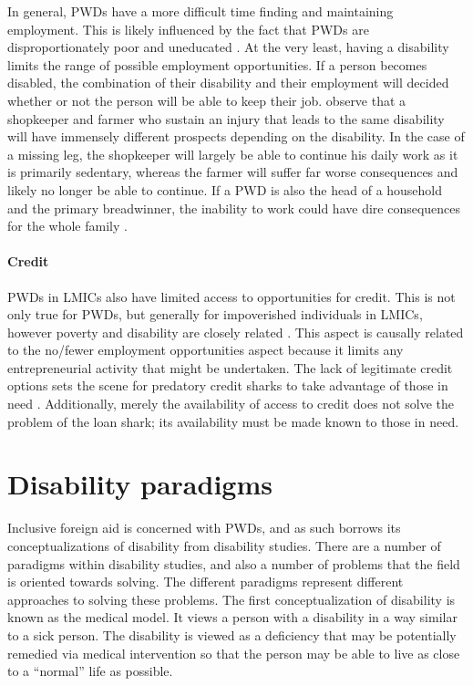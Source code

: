 \documentclass[a4paper]{article}
\begin{document}
In general, PWDs have a more difficult time finding and maintaining
employment. This is likely influenced by the fact that PWDs are
disproportionately poor and uneducated \cite{lamichhane2014nexus}. At the very
least, having a disability limits the range of possible employment
opportunities. If a person becomes disabled, the combination of their
disability and their employment will decided whether or not the person will be
able to keep their job. \cite{chowdhury2006economics} observe that a
shopkeeper and farmer who sustain an injury that leads to the same disability
will have immensely different prospects depending on the disability. In the
case of a missing leg, the shopkeeper will largely be able to continue his
daily work as it is primarily sedentary, whereas the farmer will suffer far
worse consequences and likely no longer be able to continue. If a PWD is also
the head of a household and the primary breadwinner, the inability to work
could have dire consequences for the whole family \citep{world2011world}.


\paragraph{Credit}

PWDs in LMICs also have limited access to opportunities for credit. This is
not only true for PWDs, but generally for impoverished individuals in LMICs,
however poverty and disability are closely related
\citep{palmer2011disability}. This aspect is causally related to the no/fewer
employment opportunities aspect because it limits any entrepreneurial activity
that might be undertaken. The lack of legitimate credit options sets the scene
for predatory credit sharks to take advantage of those in need
\citep{beisland2017exploring}. Additionally, merely the availability of access
to credit does not solve the problem of the loan shark; its availability must
be made known to those in need.


\newpage
\section{Disability paradigms}
\label{models}

Inclusive foreign aid is concerned with PWDs, and as such borrows its
conceptualizations of disability from disability studies. There are a number
of paradigms within disability studies, and also a number of problems that the
field is oriented towards solving. The different paradigms represent different
approaches to solving these problems. The first conceptualization of
disability is known as the medical model. It views a person with a disability
in a way similar to a sick person. The disability is viewed as a deficiency
that may be potentially remedied via medical intervention so that the person
may be able to live as close to a ``normal'' life as possible.
\end{document}
